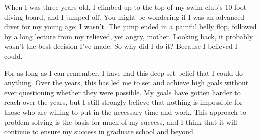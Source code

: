 \documentclass[12pt]{article}
\begin{document}



When I was three years old, I climbed up to the top of my swim club's 10 foot diving board, and I jumped off. 
You might be wondering if I was an advanced diver for my young age; I wasn't. 
The jump ended in a painful belly flop, followed by a long lecture from my relieved, yet angry, mother. 
Looking back, it probably wasn't the best decision I've made. 
So why did I do it? Because I believed I could.

For as long as I can remember, I have had this deep-set belief that I could do anything. 
Over the years, this has led me to set and achieve high goals without ever questioning whether they were possible.
My goals have gotten harder to reach over the years, but I still strongly believe that nothing is impossible for those who are willing to put in the necessary time and work.
This approach to problem-solving is the basis for much of my success, and I think that it will continue to ensure my success in graduate school and beyond.
\end{document}
